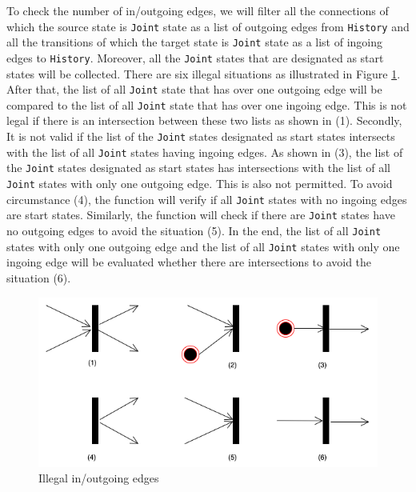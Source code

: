 To check the number of in/outgoing edges, we will filter all the connections of which the source state is \verb|Joint| state as a list of outgoing edges from \verb|History| 
and all the transitions of which the target state is \verb|Joint| state as a list of ingoing edges to \verb|History|.
Moreover, all the \verb|Joint| states that are designated as start states will be collected.
There are six illegal situations as illustrated in Figure \ref{fig:in/outgoing edges}.
After that, the list of all \verb|Joint| state that has over one outgoing edge will be compared to the list of all \verb|Joint| state that has over one ingoing edge.
This is not legal if there is an intersection between these two lists as shown in (1).
Secondly, It is not valid if the list of the \verb|Joint| states designated as start states intersects with the list of all \verb|Joint| states having ingoing edges.
As shown in (3), the list of the \verb|Joint| states designated as start states has intersections with the list of all \verb|Joint| states with only one outgoing edge.
This is also not permitted.
To avoid circumstance (4), the function will verify if all \verb|Joint| states with no ingoing edges are start states.
Similarly, the function will check if there are \verb|Joint| states have no outgoing edges to avoid the situation (5).
In the end, the list of all \verb|Joint| states with only one outgoing edge and the list of all \verb|Joint| states with only one ingoing edge will be evaluated whether there are intersections to avoid the situation (6).
\begin{figure}[ht]
    \centering
    \includegraphics[scale=0.5]{Bilder/MtoOne.png}
    \caption{Illegal in/outgoing edges}
    \label{fig:in/outgoing edges}
\end{figure}

